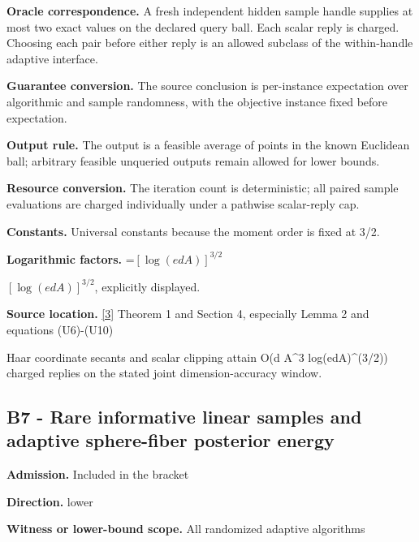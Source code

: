 \documentclass[10pt,a4paper]{article}
\newcommand{\AtlasMath}[1]{\par\begingroup\centering\setbox0=\hbox{$\displaystyle #1$}\ifdim\wd0>1.4\linewidth\typeout{ATLAS WIDE FORMULA: \the\wd0}\fi\ifdim\wd0>\linewidth\resizebox{\linewidth}{!}{\box0}\else\box0\fi\par\endgroup}
\newcommand{\AtlasInlineMath}[1]{\begingroup\setbox0=\hbox{$#1$}\ifdim\wd0>.4\linewidth\endgroup\AtlasMath{#1}\else\endgroup$#1$\fi}
\begin{document}
\textbf{Oracle correspondence.} A fresh independent hidden sample handle supplies at most two exact values on the declared query ball. Each scalar reply is charged. Choosing each pair before either reply is an allowed subclass of the within-handle adaptive interface.



\textbf{Guarantee conversion.} The source conclusion is per-instance expectation over algorithmic and sample randomness, with the objective instance fixed before expectation.



\textbf{Output rule.} The output is a feasible average of points in the known Euclidean ball; arbitrary feasible unqueried outputs remain allowed for lower bounds.



\textbf{Resource conversion.} The iteration count is deterministic; all paired sample evaluations are charged individually under a pathwise scalar-reply cap.



\textbf{Constants.} Universal constants because the moment order is fixed at 3/2.



\textbf{Logarithmic factors.} \AtlasInlineMath{[\log(edA)]^{3/2}}, explicitly displayed.



\textbf{Source location.} \href{https://github.com/WU-Wendao/Colombo/blob/main/colombo_sensorium/Complexity_altas/data/sources/colombo/COLOMBO_KIMI_003/kimi_003.pdf}{[3]} Theorem 1 and Section 4, especially Lemma 2 and equations (U6)-(U10)



Haar coordinate secants and scalar clipping attain O(d A\textasciicircum{}3 log(edA)\textasciicircum{}(3/2)) charged replies on the stated joint dimension-accuracy window.



\subsection{B7 - Rare informative linear samples and adaptive sphere-fiber posterior energy}


\textbf{Admission.} Included in the bracket



\textbf{Direction.} lower



\textbf{Witness or lower-bound scope.} All randomized adaptive algorithms
\end{document}
